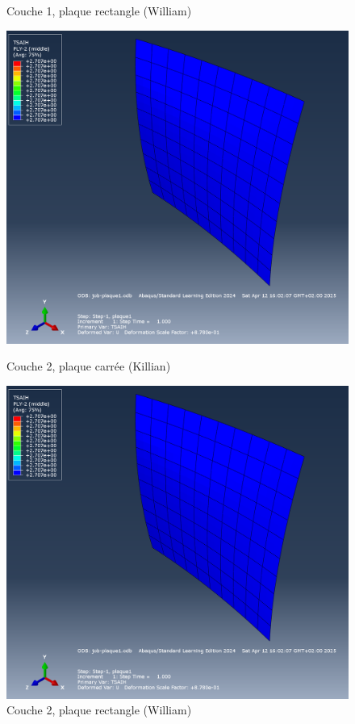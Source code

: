 \documentclass[a4paper,12pt]{article}
\begin{document}
\begin{figure}[h!]
\begin{minipage}[t][0.3\textheight]{0.495\textwidth}
		\caption{Couche 1, plaque rectangle (William)}
		\label{fig:image2}
	\end{minipage}
\end{figure}

\begin{figure}[h!]
	\centering
	\begin{minipage}[t][0.3\textheight]{0.495\textwidth}
		\centering
		\includegraphics[width=\textwidth]{media/K_P1_L2_12042025.png} %
		\caption{Couche 2, plaque carrée (Killian)}
		\label{fig:image1}
	\end{minipage}
	\hfill
	\begin{minipage}[t][0.3\textheight]{0.495\textwidth}
		\centering
		\includegraphics[width=\textwidth]{media/K_P1_L2_12042025.png} %
		\caption{Couche 2, plaque rectangle (William)}
		\label{fig:image2}
	\end{minipage}
\end{figure}
\end{document}
